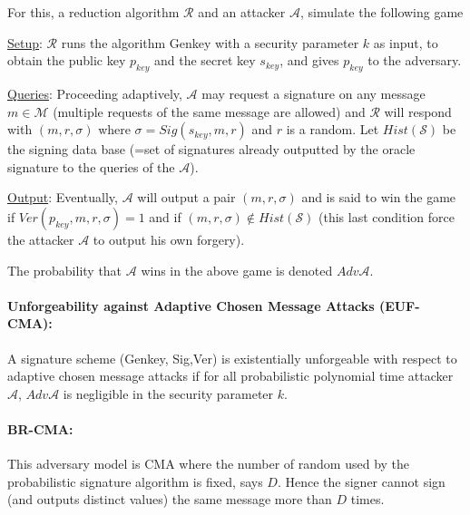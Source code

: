 \documentclass[a4paper,11pt]{article}
\begin{document}
For this, a reduction algorithm $\mathcal{R}$ and an attacker $\mathcal{A}$, simulate the following game

\underline{Setup}: $\mathcal{R}$ runs the algorithm Genkey with a security parameter $k$ as input, to obtain the public key $p_{key}$ and the secret key $s_{key}$, and gives $p_{key}$ to the adversary.

\underline{Queries}: Proceeding adaptively, $\mathcal{A}$ may request a signature on any message  $m \in  \mathcal{M}$
 (multiple requests of the same message are allowed) and $\mathcal{R}$ will respond with $(m, r,  \sigma)$ where $\sigma= Sig(s_{key}, m, r)$ and $r$ is a random. Let $Hist(\mathcal{S})$ be the signing data base (=set of signatures already outputted by the oracle signature to the queries of the  $\mathcal{A}$).

\underline{Output}: Eventually, $\mathcal{A}$ will output a pair $(m, r,  \sigma)$ and is said to win the game
 if $Ver(p_{key}, m, r, \sigma)=1$ and if $ (m, r,  \sigma) \notin Hist(\mathcal{S})$ (this last condition force the attacker $\mathcal{A}$ to output his own forgery).


The probability that  $\mathcal{A}$ wins in the above game is denoted  $Adv\mathcal{A}$.

\paragraph{Unforgeability against Adaptive Chosen Message Attacks (EUF-CMA):}  A signature scheme (Genkey, Sig,Ver)
is existentially unforgeable with respect to adaptive chosen message attacks if for all probabilistic polynomial
 time attacker $\mathcal{A}$, $Adv\mathcal{A}$ is negligible in  the security parameter $k$.

\paragraph{BR-CMA:} This adversary model is CMA where the number of random used by the probabilistic signature algorithm is fixed, says $D$. Hence the signer cannot sign (and outputs distinct values) the same message more than $D$ times.

\end{document}
